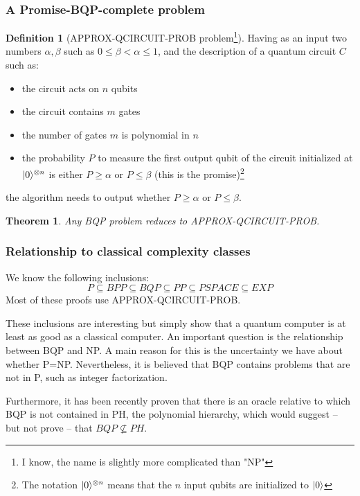 \documentclass[12pt,a4paper]{article}
\theoremstyle{plain}
\newtheorem*{theorem}{Theorem}
\theoremstyle{definition}
\newtheorem*{definition}{Definition}
\DeclarePairedDelimiter\ket{\lvert}{\rangle}
\begin{document}
\subsubsection{A Promise-BQP-complete problem}
\begin{definition}[APPROX-QCIRCUIT-PROB problem\footnote{I know, the name is slightly more complicated than "NP"}]
    Having as an input two numbers $\alpha, \beta$ such as $0\leq\beta<\alpha\leq 1$, and the description of a quantum circuit $C$ such as:
    \begin{itemize}[label=--, noitemsep]
        \item the circuit acts on $n$ qubits
        \item the circuit contains $m$ gates
        \item the number of gates $m$ is polynomial in $n$
        \item the probability $P$ to measure the first output qubit of the circuit initialized at $\ket{0}^{\otimes n}$ is either $P\geq\alpha$ or $P\leq\beta$ (this is the promise)\footnote{The notation $\ket{0}^{\otimes n}$ means that the $n$ input qubits are initialized to $\ket{0}$}
    \end{itemize}
    the algorithm needs to output whether $P\geq\alpha$ or $P\leq\beta$.
\end{definition}

\begin{theorem}
    Any BQP problem reduces to APPROX-QCIRCUIT-PROB.
\end{theorem}

\subsubsection{Relationship to classical complexity classes}
We know the following inclusions:
\begin{equation*}
    P \subseteq BPP \subseteq BQP \subseteq PP \subseteq PSPACE \subseteq EXP
\end{equation*}
Most of these proofs use APPROX-QCIRCUIT-PROB.

These inclusions are interesting but simply show that a quantum computer is at least as good as a classical computer. An important question is the relationship between BQP and NP. A main reason for this is the uncertainty we have about whether P=NP. Nevertheless, it is believed that BQP contains problems that are not in P, such as integer factorization.

Furthermore, it has been recently proven\cite{oracle-bqp-ph} that there is an oracle relative to which BQP is not contained in PH, the polynomial hierarchy, which would suggest -- but not prove -- that $BQP \nsubseteq PH$.
\end{document}
